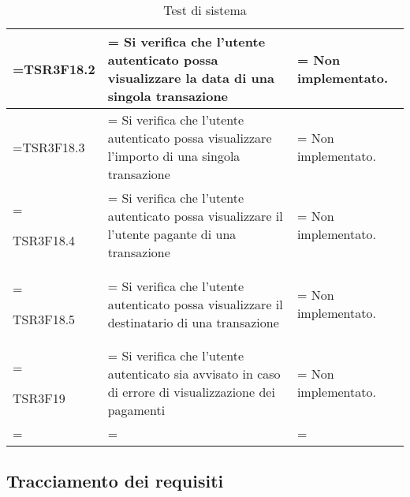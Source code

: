 \begin{xltabular}{\textwidth} {
        >{\hsize\linewidth=\hsize}X
        >{\hsize\linewidth=\hsize}X
        >{\hsize\linewidth=\hsize}X
    }
    TSR3F18.2 &
    Si verifica che l'utente autenticato possa visualizzare la data di una singola transazione &
    Non implementato.
    \\ \hline

    TSR3F18.3 &
    Si verifica che l'utente autenticato possa visualizzare l'importo di una singola transazione &
    Non implementato.
    \\ \hline

    TSR3F18.4 &
    Si verifica che l'utente autenticato possa visualizzare il l'utente pagante di una transazione &
    Non implementato.
    \\ \hline

    TSR3F18.5 &
    Si verifica che l'utente autenticato possa visualizzare il destinatario di una transazione &
    Non implementato.
    \\ \hline

    TSR3F19 &
    Si verifica che l'utente autenticato sia avvisato in caso di errore di visualizzazione dei pagamenti &
    Non implementato.
    \\ \hline


    \caption{Test di sistema}
\end{xltabular}

\subsection{Tracciamento dei requisiti}

